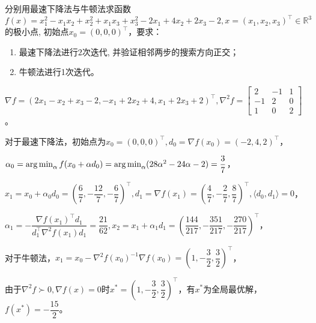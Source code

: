     \begin{homework}[6pts]
        分别用最速下降法与牛顿法求函数$f(x)=x_1^2-x_1 x_2
        +x_2^2+x_1 x_3+x_3^2-2x_1+4x_2+2x_3-2, x=(x_1,x_2,x_3)^{\top}\in\mathbb{R}^3$的极小点, 初始点$x_0=(0,0,0)^{\top}$，要求：
        \begin{enumerate}
            \item 最速下降法进行$2$次迭代, 并验证相邻两步的搜索方向正交；
            \item 牛顿法进行1次迭代。
        \end{enumerate}
    \end{homework}

    \begin{solution}
        $\nabla f=(2x_1-x_2+x_3-2,-x_1+2x_2+4,x_1+2x_3+2)^{\top},\nabla^2 f=\begin{bmatrix}2&-1&1\\-1&2&0\\1&0&2\end{bmatrix}$。

        对于最速下降法，初始点为$x_0=(0,0,0)^{\top},d_0=\nabla f(x_0)=(-2,4,2)^{\top}$，

        $\alpha_0=\operatorname*{arg\,min}_{\alpha}f(x_0+\alpha d_0)=\operatorname*{arg\,min}_{\alpha}(28\alpha^2-24\alpha-2)=\dfrac37$，

        $x_1=x_0+\alpha_0 d_0=\left(\dfrac67,-\dfrac{12}7,-\dfrac67\right)^{\top},d_1=\nabla f(x_1)=\left(\dfrac47,-\dfrac27,\dfrac87\right)^{\top},\langle d_0,d_1\rangle=0$，

        $\alpha_1=-\dfrac{\nabla f(x_1)^{\top}d_1}{d_1^{\top}\nabla^2 f(x_1)d_1}=\dfrac{21}{62},x_2=x_1+\alpha_1 d_1=\left(\dfrac{144}{217},-\dfrac{351}{217},-\dfrac{270}{217}\right)^{\top}$，

        对于牛顿法，$x_1=x_0-\nabla^2 f(x_0)^{-1}\nabla f(x_0)=\left(1,-\dfrac32,\dfrac32\right)^{\top}$，

        由于$\nabla^2 f\succ 0,\nabla f(x)=0$时$x^*=\left(1,-\dfrac32,\dfrac32\right)^{\top}$，有$x^*$为全局最优解，$f(x^*)=-\dfrac{15}2$。
    \end{solution}